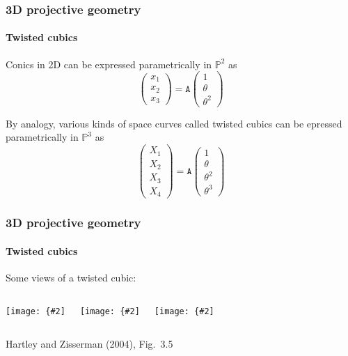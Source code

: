 \documentclass[aspectratio=169]{beamer}
\newcommand{\mat}[1]{\mathtt{#1}}
\def\Pset{\mathbb{P}}
\newcommand{\myfig}[3]{\centerline{\texttt{[image: \{\#2]}}}
\begin{document}
\begin{frame}
\frametitle{3D projective geometry}
\framesubtitle{Twisted cubics}

Conics in 2D can be expressed parametrically in $\Pset^2$ as
\begin{equation}
\begin{pmatrix} x_1 \\ x_2 \\ x_3 \end{pmatrix} =
\mat{A} \begin{pmatrix} 1 \\ \theta \\ \theta^2 \end{pmatrix}
\end{equation}

\medskip

By analogy, various kinds of space curves called \alert{twisted
cubics} can be epressed parametrically in $\Pset^3$ as
\begin{equation}
\begin{pmatrix} X_1 \\ X_2 \\ X_3 \\ X_4 \end{pmatrix} =
\mat{A} \begin{pmatrix} 1 \\ \theta \\ \theta^2 \\ \theta^3 \end{pmatrix}
\end{equation}

\medskip

\end{frame}

\begin{frame}
\frametitle{3D projective geometry}
\framesubtitle{Twisted cubics}

Some views of a twisted cubic:
\begin{columns}
\column{1.3in}
\myfig{1.3in}{HZ-fig2-5a}{}
\column{1.3in}
\myfig{1.3in}{HZ-fig2-5b}{}
\column{1.3in}
\myfig{1.3in}{HZ-fig2-5c}{}
\end{columns}
\centerline{Hartley and Zisserman (2004), Fig.\ 3.5}

\end{frame}
\end{document}
